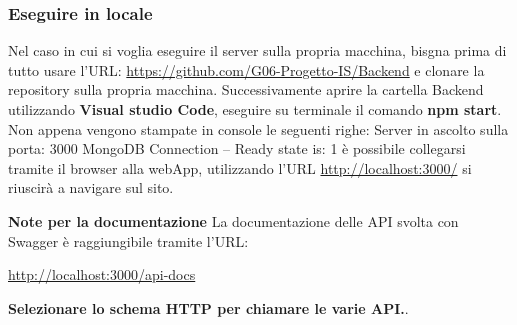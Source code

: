 \documentclass{article}
\begin{document}
\subsubsection{Eseguire in locale}
Nel caso in cui si voglia eseguire il server sulla propria macchina, bisgna prima di tutto usare l'URL: \url{https://github.com/G06-Progetto-IS/Backend} e clonare la repository sulla propria macchina.
Successivamente aprire la cartella Backend utilizzando \textbf{Visual studio Code}, eseguire su terminale il comando \textbf{npm start}.
Non appena vengono stampate in console le seguenti righe:
Server in ascolto sulla porta: 3000
MongoDB Connection -- Ready state is: 1
è possibile collegarsi tramite il browser alla webApp, utilizzando l'URL \url{http://localhost:3000/} si riuscirà a navigare sul sito.

\textbf{Note per la documentazione}
La documentazione delle API svolta con Swagger è raggiungibile tramite l'URL: 
\begin{center}
  \url{http://localhost:3000/api-docs}  
\end{center}
\textbf{Selezionare lo schema HTTP per chiamare le varie API.}.
\end{document}
